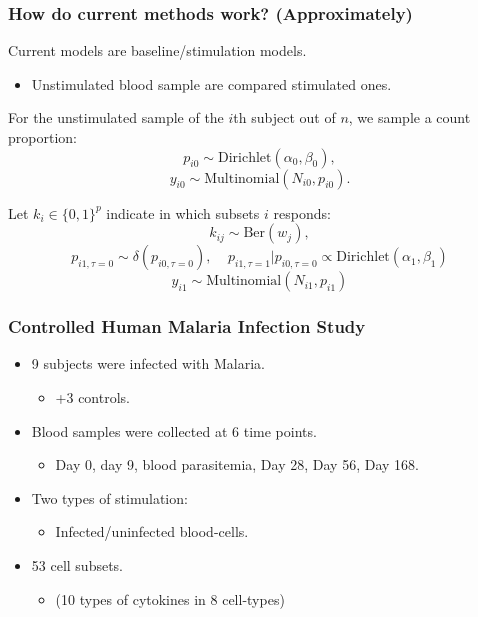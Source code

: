 \documentclass{beamer}
\theoremstyle{definition}
\begin{document}

\begin{frame}
\frametitle{How do current methods work? (Approximately)}
Current models are baseline/stimulation models. 
\begin{itemize}
\item  Unstimulated blood sample are compared stimulated ones.
\end{itemize}
\vspace{0.3 cm}

\pause
For the unstimulated sample of the $i$th subject out of $n$, we sample a count proportion:
$$
p_{i0} \sim \text{Dirichlet}(\alpha_{0},\beta_{0}),
$$$$
y_{i0} \sim \text{Multinomial}(N_{i0}, p_{i0}).
$$


\vspace{0.3 cm}
\pause
Let $k_i \in \{0,1\}^{p}$ indicate in which subsets $i$ responds:
$$
k_{ij} \sim \text{Ber}(w_j),
$$$$
p_{i1,\tau = 0} \sim \delta(p_{i0,\tau = 0}), \;\;\;\;
p_{i1, \tau = 1} | p_{i0,\tau = 0}  \propto \text{Dirichlet}(\alpha_1, \beta_{1})
$$$$
y_{i1} \sim \text{Multinomial}(N_{i1}, p_{i1})
$$
\end{frame}


\begin{frame}
\frametitle{Controlled Human Malaria Infection Study}
\begin{itemize}
\item 9 subjects were infected with Malaria.
	\begin{itemize}
	\item +3 controls.
	\end{itemize}
	\vspace{0.75 cm}
	
\item Blood samples were collected at 6 time points.
	\begin{itemize}
	\item Day 0, day 9, blood  parasitemia, Day 28, Day 56, Day 168.
	\end{itemize}
	\vspace{0.75 cm}

\item Two types of stimulation:
	\begin{itemize}
	\item Infected/uninfected blood-cells.
	\end{itemize}
	\vspace{0.75 cm}
	
\item 53 cell subsets.
	\begin{itemize}
	\item (10 types of cytokines in 8 cell-types)
	\end{itemize} 
\end{itemize}
\end{frame}
\end{document}
